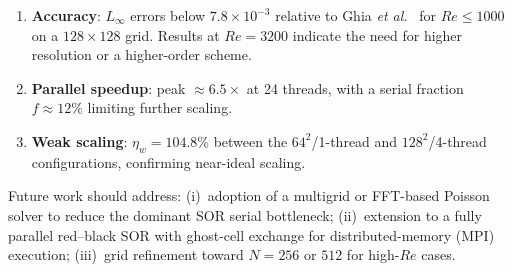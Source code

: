 \documentclass[conference]{IEEEtran}
\begin{document}
\begin{enumerate}
  \item \textbf{Accuracy}: $L_\infty$ errors below $7.8\times10^{-3}$
        relative to Ghia \textit{et al.}~\cite{ghia1982} for $Re \le 1000$
        on a $128\times128$ grid.  Results at $Re=3200$ indicate the
        need for higher resolution or a higher-order scheme.
  \item \textbf{Parallel speedup}: peak $\approx\!6.5\times$ at 24 threads,
        with a serial fraction $f\approx12\%$ limiting further scaling.
  \item \textbf{Weak scaling}: $\eta_w = 104.8\%$ between the
        $64^2$/1-thread and $128^2$/4-thread configurations,
        confirming near-ideal scaling.
\end{enumerate}

Future work should address: (i)~adoption of a multigrid or FFT-based
Poisson solver to reduce the dominant SOR serial bottleneck;
(ii)~extension to a fully parallel red--black SOR with ghost-cell
exchange for distributed-memory (MPI) execution;
(iii)~grid refinement toward $N=256$ or $512$ for high-$Re$ cases.



\end{document}
